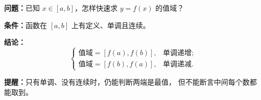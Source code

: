 \textbf{问题：}已知 $x\in[a,b]$，怎样快速求 $y=f(x)$ 的值域？

\textbf{条件：}函数在 $[a,b]$ 上有定义、单调且连续。

\textbf{结论：}
\[
\begin{cases}
\text{值域}=[f(a),f(b)],&\text{单调递增};\\
\text{值域}=[f(b),f(a)],&\text{单调递减}.
\end{cases}
\]

\textbf{提醒：}只有单调、没有连续时，仍能判断两端是最值，
但不能断言中间每个数都能取到。
